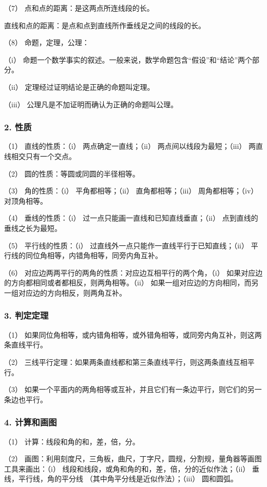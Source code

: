 （7） 点和点的距离：是这两点所连线段的长。

直线和点的距离：是点和点到直线所作垂线足之间的线段的长。

（8） 命题，定理，公理：

（i）
命题一个数学事实的叙述。一般来说，数学命题包含``假设''和``结论''两个部分。

（ii） 定理经过证明结论是正确的命题叫定理。

（iii） 公理凡是不加证明而确认为正确的命题叫公理。

\subsubsection{2. 性质}

（1） 直线的性质：（i） 两点确定一直线；（ii）
两点间以线段为最短；（iii） 两直线相交只有一个交点。

（2） 圆的性质：等圆或同圆的半径相等。

（3） 角的性质：（i） 平角都相等；（ii） 直角都相等；（iii）
周角都相等；（iv） 对顶角相等。

（4） 垂线的性质：（i） 过一点只能画一直线和已知直线垂直；（ii）
点到直线的垂线之长为最短。

（5） 平行线的性质：（i） 过直线外一点只能作一直线平行于已知直线；（ii）
平行线的同位角相等，内错角相等，同旁内角互补。

（6） 对应边两两平行的两角的性质：对应边互相平行的两个角，（i）
如果对应边的方向都相同或者都相反，则两角相等。（ii）
如果一组对应边的方向相同，而另一组对应边的方向相反，则两角互补。

\subsubsection{3. 判定定理}

（1）
如果同位角相等，或内错角相等，或外错角相等，或同旁内角互补，则这两条直线平行。

（2）
三线平行定理：如果两条直线都和第三条直线平行，则这两条直线互相平行。

（3）
如果一个平面内的两角相等或互补，并且它们有一条边平行，则它们的另一条边也平行。

\subsubsection{4. 计算和画图}

（1） 计算：线段和角的和，差，倍，分。

（2）
画图：利用刻度尺，三角板，曲尺，丁字尺，圆规，分割规，量角器等画图工具来画出：（i）
线段和线段，或角和角的和，差，倍，分的近似作法；（ii）
垂线，平行线，角的平分线 （其中角平分线是近似作法）；（iii） 圆和圆弧。

